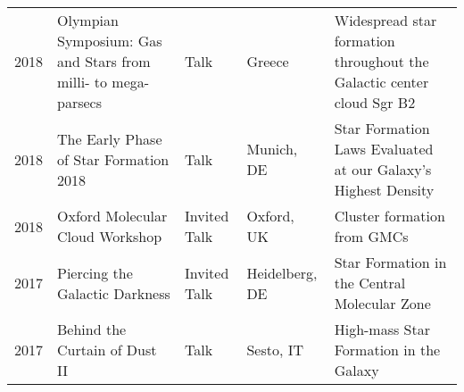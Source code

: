 \begin{tabular}{cp{1.8in}p{1.5cm}p{1.5cm}p{3.0in}}
    2018 &      Olympian Symposium: Gas and Stars from milli- to mega-parsecs & Talk & Greece & 	Widespread star formation throughout the Galactic center cloud Sgr B2 \\
    2018 &      The Early Phase of Star Formation 2018 & Talk & Munich, DE & Star Formation Laws Evaluated at our Galaxy's Highest Density \\
    2018 &      Oxford Molecular Cloud Workshop & Invited Talk & Oxford, UK & Cluster formation from GMCs \\
    2017 &      Piercing the Galactic Darkness & Invited Talk & Heidelberg, DE & Star Formation in the Central Molecular Zone \\
    2017 &      Behind the Curtain of Dust II & Talk & Sesto, IT & High-mass Star Formation in the Galaxy \\

\end{tabular}
